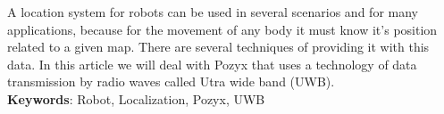 \begin{thesisabastract}

A location system for robots can be used in several scenarios and for many applications, because for the movement of any body it must know it's position related to a given map. There are several techniques of providing it with this data. In this article we will deal with Pozyx that uses a technology of data transmission by radio waves called Utra wide band (UWB).
\ \\


\textbf{Keywords}: Robot, Localization, Pozyx, UWB

\end{thesisabastract}
